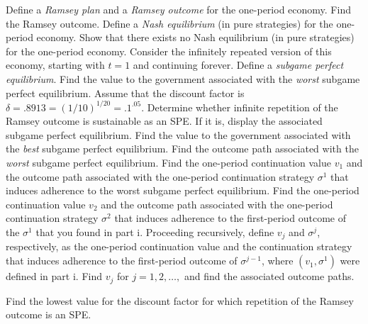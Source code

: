 \medskip
{}  Define a {\it Ramsey plan\/} and a {\it Ramsey outcome\/}
for the one-period economy.  Find the Ramsey outcome.
\smallskip
{}  Define a {\it Nash equilibrium\/} (in pure strategies) for the
 one-period economy.
\smallskip
{}  Show that there exists no Nash equilibrium (in pure strategies)
for the one-period economy.
\smallskip
{}  Consider the infinitely repeated version of this economy, starting
with $t=1$ and continuing forever.
Define a {\it subgame perfect equilibrium}.
\smallskip
{}  Find the value to the government associated with the
{\it worst\/} subgame perfect equilibrium.
\smallskip
{} Assume that the discount factor is $\delta = .8913
= (1/10)^{1/20}=.1^{.05}$.
 Determine whether infinite repetition of the Ramsey outcome
is sustainable as an SPE.  If it is,
display the associated subgame perfect equilibrium.
\smallskip
{} Find the value to the government associated with the {\it best\/}
subgame perfect equilibrium.
\smallskip
{}  Find the outcome path associated with the {\it worst\/} subgame
perfect equilibrium.
\smallskip
{}  Find the one-period continuation value $v_1$ and
the outcome path associated with
the one-period continuation strategy $\sigma^1$ that induces
adherence to the worst subgame perfect equilibrium.
\smallskip
{}  Find the one-period continuation value $v_2$ and
the outcome path associated with the one-period continuation
strategy $\sigma^2$ that induces adherence to the
first-period outcome of the $\sigma^1$ that you found in part i.
\smallskip
{} Proceeding recursively, define $v_j$ and $\sigma^j$, respectively,
as the one-period continuation value and the continuation strategy
that induces adherence to the first-period outcome of $\sigma^{j-1}$,
where $(v_1, \sigma^1)$ were defined in part i.  Find $v_j$ for
$j= 1, 2, \ldots,$ and find the associated outcome paths.

\smallskip
{}  Find the lowest value for the discount factor for which repetition
of the Ramsey outcome is an SPE.

